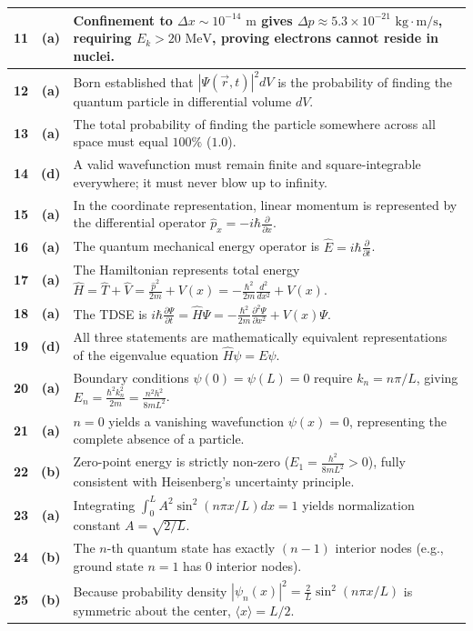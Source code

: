 {\begin{tabularx}{\textwidth}{|c|c|X|}
\textbf{11} & \textbf{(a)} & Confinement to $\Delta x \sim 10^{-14}\text{ m}$ gives $\Delta p \approx 5.3 \times 10^{-21}\text{ kg}\cdot\text{m/s}$, requiring $E_k > 20\text{ MeV}$, proving electrons cannot reside in nuclei. \\ \hline
\textbf{12} & \textbf{(a)} & Born established that $|\Psi(\vec{r},t)|^2 dV$ is the probability of finding the quantum particle in differential volume $dV$. \\ \hline
\textbf{13} & \textbf{(a)} & The total probability of finding the particle somewhere across all space must equal $100\%$ ($1.0$). \\ \hline
\textbf{14} & \textbf{(d)} & A valid wavefunction must remain finite and square-integrable everywhere; it must never blow up to infinity. \\ \hline
\textbf{15} & \textbf{(a)} & In the coordinate representation, linear momentum is represented by the differential operator $\hat{p}_x = -i\hbar \frac{\partial}{\partial x}$. \\ \hline
\textbf{16} & \textbf{(a)} & The quantum mechanical energy operator is $\hat{E} = i\hbar \frac{\partial}{\partial t}$. \\ \hline
\textbf{17} & \textbf{(a)} & The Hamiltonian represents total energy $\hat{H} = \hat{T} + \hat{V} = \frac{\hat{p}^2}{2m} + V(x) = -\frac{\hbar^2}{2m}\frac{d^2}{dx^2} + V(x)$. \\ \hline
\textbf{18} & \textbf{(a)} & The TDSE is $i\hbar \frac{\partial \Psi}{\partial t} = \hat{H}\Psi = -\frac{\hbar^2}{2m}\frac{\partial^2 \Psi}{\partial x^2} + V(x)\Psi$. \\ \hline
\textbf{19} & \textbf{(d)} & All three statements are mathematically equivalent representations of the eigenvalue equation $\hat{H}\psi = E\psi$. \\ \hline
\textbf{20} & \textbf{(a)} & Boundary conditions $\psi(0)=\psi(L)=0$ require $k_n = n\pi/L$, giving $E_n = \frac{\hbar^2 k_n^2}{2m} = \frac{n^2 h^2}{8mL^2}$. \\ \hline
\textbf{21} & \textbf{(a)} & $n=0$ yields a vanishing wavefunction $\psi(x) = 0$, representing the complete absence of a particle. \\ \hline
\textbf{22} & \textbf{(b)} & Zero-point energy is strictly non-zero ($E_1 = \frac{h^2}{8mL^2} > 0$), fully consistent with Heisenberg's uncertainty principle. \\ \hline
\textbf{23} & \textbf{(a)} & Integrating $\int_0^L A^2 \sin^2(n\pi x/L)dx = 1$ yields normalization constant $A = \sqrt{2/L}$. \\ \hline
\textbf{24} & \textbf{(b)} & The $n$-th quantum state has exactly $(n - 1)$ interior nodes (e.g., ground state $n=1$ has $0$ interior nodes). \\ \hline
\textbf{25} & \textbf{(b)} & Because probability density $|\psi_n(x)|^2 = \frac{2}{L}\sin^2(n\pi x/L)$ is symmetric about the center, $\langle x \rangle = L/2$. \\ \hline
\end{tabularx}
}

